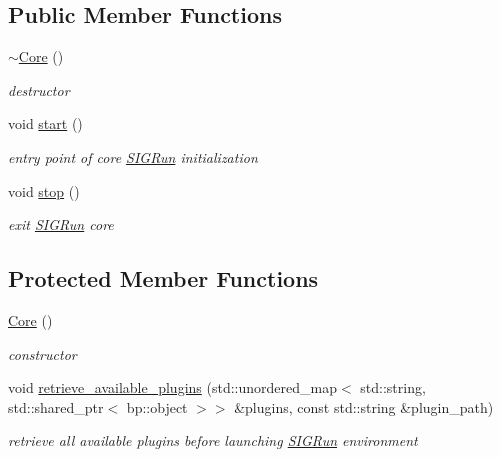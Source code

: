 \subsection*{Public Member Functions}
\begin{DoxyCompactItemize}
\item 
\mbox{\hyperlink{class_core_a776f8c46504b14183883c6273f93eaed}{$\sim$\+Core}} ()
\begin{DoxyCompactList}\small\item\em destructor \end{DoxyCompactList}\item 
void \mbox{\hyperlink{class_core_a0e1d6754f6c2cabd2cd2862d541fe127}{start}} ()
\begin{DoxyCompactList}\small\item\em entry point of core \mbox{\hyperlink{class_s_i_g_run}{S\+I\+G\+Run}} initialization \end{DoxyCompactList}\item 
void \mbox{\hyperlink{class_core_a034f9e2fcfea6cad68318a938fb0c926}{stop}} ()
\begin{DoxyCompactList}\small\item\em exit \mbox{\hyperlink{class_s_i_g_run}{S\+I\+G\+Run}} core \end{DoxyCompactList}\end{DoxyCompactItemize}
\subsection*{Protected Member Functions}
\begin{DoxyCompactItemize}
\item 
\mbox{\hyperlink{class_core_a14e63188e0aa7c4a6f72d5501384d1f9}{Core}} ()
\begin{DoxyCompactList}\small\item\em constructor \end{DoxyCompactList}\item 
void \mbox{\hyperlink{class_core_a3a6a2f7dac4b218a4c7e165c1999197f}{retrieve\+\_\+available\+\_\+plugins}} (std\+::unordered\+\_\+map$<$ std\+::string, std\+::shared\+\_\+ptr$<$ bp\+::object $>$$>$ \&plugins, const std\+::string \&plugin\+\_\+path)
\begin{DoxyCompactList}\small\item\em retrieve all available plugins before launching \mbox{\hyperlink{class_s_i_g_run}{S\+I\+G\+Run}} environment \end{DoxyCompactList}\end{DoxyCompactItemize}
